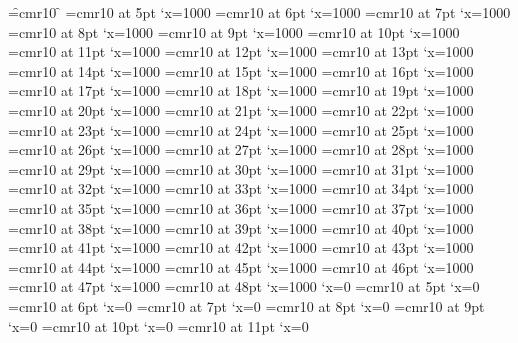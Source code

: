 
\font\f=cmr10 \f
{}\nullfont=5pt
\font\FAA=cmr10 at 5pt \efcode\FAA`x=1000
\font\FAB=cmr10 at 6pt \efcode\FAB`x=1000
\font\FAC=cmr10 at 7pt \efcode\FAC`x=1000
\font\FAD=cmr10 at 8pt \efcode\FAD`x=1000
\font\FAE=cmr10 at 9pt \efcode\FAE`x=1000
\font\FAF=cmr10 at 10pt \efcode\FAF`x=1000
\font\FAG=cmr10 at 11pt \efcode\FAG`x=1000
\font\FAH=cmr10 at 12pt \efcode\FAH`x=1000
\font\FAI=cmr10 at 13pt \efcode\FAI`x=1000
\font\FAJ=cmr10 at 14pt \efcode\FAJ`x=1000
\font\FAK=cmr10 at 15pt \efcode\FAK`x=1000
\font\FAL=cmr10 at 16pt \efcode\FAL`x=1000
\font\FAM=cmr10 at 17pt \efcode\FAM`x=1000
\font\FAN=cmr10 at 18pt \efcode\FAN`x=1000
\font\FAO=cmr10 at 19pt \efcode\FAO`x=1000
\font\FAP=cmr10 at 20pt \efcode\FAP`x=1000
\font\FAQ=cmr10 at 21pt \efcode\FAQ`x=1000
\font\FAR=cmr10 at 22pt \efcode\FAR`x=1000
\font\FAS=cmr10 at 23pt \efcode\FAS`x=1000
\font\FAT=cmr10 at 24pt \efcode\FAT`x=1000
\font\FAU=cmr10 at 25pt \efcode\FAU`x=1000
\font\FAV=cmr10 at 26pt \efcode\FAV`x=1000
\font\FAW=cmr10 at 27pt \efcode\FAW`x=1000
\font\FAX=cmr10 at 28pt \efcode\FAX`x=1000
\font\FAY=cmr10 at 29pt \efcode\FAY`x=1000
\font\FAZ=cmr10 at 30pt \efcode\FAZ`x=1000
\font\FBA=cmr10 at 31pt \efcode\FBA`x=1000
\font\FBB=cmr10 at 32pt \efcode\FBB`x=1000
\font\FBC=cmr10 at 33pt \efcode\FBC`x=1000
\font\FBD=cmr10 at 34pt \efcode\FBD`x=1000
\font\FBE=cmr10 at 35pt \efcode\FBE`x=1000
\font\FBF=cmr10 at 36pt \efcode\FBF`x=1000
\font\FBG=cmr10 at 37pt \efcode\FBG`x=1000
\font\FBH=cmr10 at 38pt \efcode\FBH`x=1000
\font\FBI=cmr10 at 39pt \efcode\FBI`x=1000
\font\FBJ=cmr10 at 40pt \efcode\FBJ`x=1000
\font\FBK=cmr10 at 41pt \efcode\FBK`x=1000
\font\FBL=cmr10 at 42pt \efcode\FBL`x=1000
\font\FBM=cmr10 at 43pt \efcode\FBM`x=1000
\font\FBN=cmr10 at 44pt \efcode\FBN`x=1000
\font\FBO=cmr10 at 45pt \efcode\FBO`x=1000
\font\FBP=cmr10 at 46pt \efcode\FBP`x=1000
\font\FBQ=cmr10 at 47pt \efcode\FBQ`x=1000
\font\FBR=cmr10 at 48pt \efcode\FBR`x=1000
\knbscode\nullfont`x=0
\font\F=cmr10 at 5pt \lpcode\F`x=0
\font\F=cmr10 at 6pt \lpcode\F`x=0
\font\F=cmr10 at 7pt \lpcode\F`x=0
\font\F=cmr10 at 8pt \lpcode\F`x=0
\font\F=cmr10 at 9pt \lpcode\F`x=0
\font\F=cmr10 at 10pt \lpcode\F`x=0
\font\F=cmr10 at 11pt \lpcode\F`x=0
